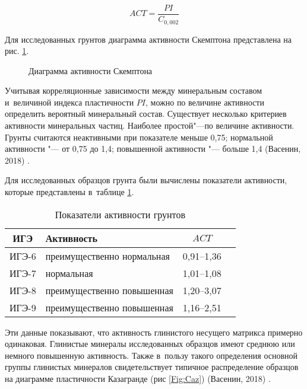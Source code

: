 \begin{equation}
    \label{eq:act}
    ACT = \frac{PI}{C_{0,002}}
\end{equation}

Для исследованных грунтов диаграмма активности Скемптона представлена на рис. \ref{Fig:Skt}.

\begin{figure}[ht]
    \centering
    \small
    
    \caption{Диаграмма активности Скемптона}
    \label{Fig:Skt}
\end{figure}

Учитывая корреляционные зависимости между минеральным составом и~величиной индекса пластичности $PI$, можно по величине активности определить вероятный минеральный состав. Существует несколько критериев активности минеральных частиц. Наиболее простой"---по величине активности. 
Грунты считаются неактивными при показателе меньше 0,75; нормальной активности "--- от 0,75 до 1,4; повышенной активности "--- больше 1,4 (Васенин, 2018) \cite{vasenin2018}.





Для исследованных образцов грунта были вычислены показатели активности, которые представлены в~таблице \ref{tab:ak}.

\begin{table}[ht]
    \centering
    \caption{Показатели активности грунтов} \label{tab:ak}
    \begin{tabular}{clcc}
    ИГЭ & Активность &  $ACT$ \\
    \midrule
    ИГЭ-6 \dotfill &  преимущественно нормальная & 0,91--1,36 \\
    ИГЭ-7 \dotfill &  нормальная & 1,01--1,08 \\
    ИГЭ-8 \dotfill &  преимущественно повышенная & 1,20--3,07 \\
    ИГЭ-9 \dotfill &  преимущественно повышенная & 1,16--2,51\\
    \end{tabular}
\end{table}
    

Эти данные показывают, что активность глинистого несущего матрикса примерно одинаковая. Глинистые минералы исследованных образцов имеют среднюю или немного повышенную активность.
Также в~пользу такого определения основной группы глинистых минералов свидетельствует типичное распределение образцов на диаграмме пластичности Казагранде (рис \ref{Fig:Caz}) (Васенин, 2018) \cite{vasenin2018}.







